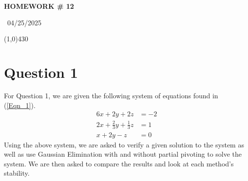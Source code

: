 \documentclass{article}
\begin{document}
\begin{center}
 \LARGE\bfseries HOMEWORK \# 12
\end{center}
\begin{center}
    ~04/25/2025~
\end{center}
 \line(1,0){430}

\section{Question 1}
For Question 1, we are given the following system of equations found in (\ref{Eqn_1}).
\begin{equation}
    \label{Eqn_1}
    \begin{split}
        6x + 2y + 2z &= -2 \\
        2x + \frac{2}{3}y + \frac{1}{3}z &= 1 \\
        x + 2y - z &= 0
    \end{split}
\end{equation}
Using the above system, we are asked to verify a given solution to the system as well as use Gaussian Elimination with and without partial pivoting to solve the system. We are then asked to compare the results and look at each method's stability.
\end{document}
